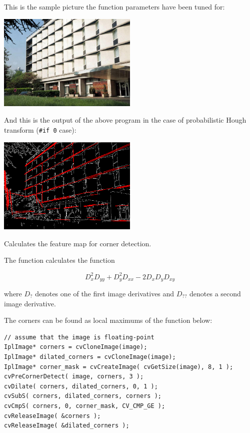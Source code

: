 This is the sample picture the function parameters have been tuned for:

\includegraphics[width=0.5\textwidth]{pics/building.jpg}

And this is the output of the above program in the case of probabilistic Hough transform (\texttt{\#if 0} case):

\includegraphics[width=0.5\textwidth]{pics/houghp.png}
\fi

Calculates the feature map for corner detection.

\begin{description}
\end{description}

The function calculates the function

\[
D_x^2 D_{yy} + D_y^2 D_{xx} - 2 D_x D_y D_{xy}
\]

where $D_?$ denotes one of the first image derivatives and $D_{??}$ denotes a second image derivative.

The corners can be found as local maximums of the function below:

\begin{lstlisting}
// assume that the image is floating-point
IplImage* corners = cvCloneImage(image);
IplImage* dilated_corners = cvCloneImage(image);
IplImage* corner_mask = cvCreateImage( cvGetSize(image), 8, 1 );
cvPreCornerDetect( image, corners, 3 );
cvDilate( corners, dilated_corners, 0, 1 );
cvSubS( corners, dilated_corners, corners );
cvCmpS( corners, 0, corner_mask, CV_CMP_GE );
cvReleaseImage( &corners );
cvReleaseImage( &dilated_corners );
\end{lstlisting}

